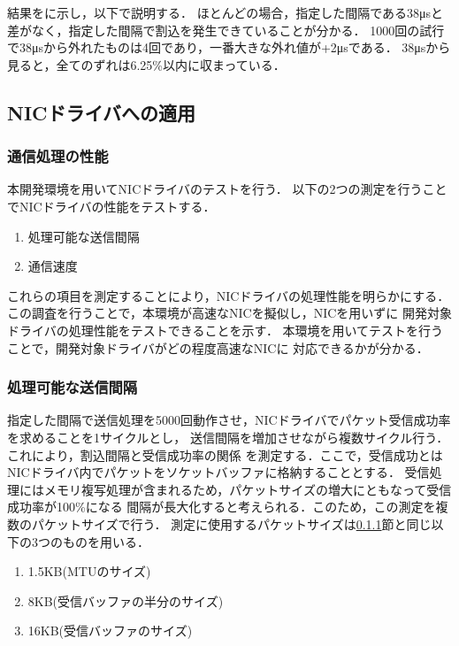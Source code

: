 \documentclass[submit,techreq,noauthor,dvipdfmx]{ipsj}
\begin{document}
結果をに示し，以下で説明する．
ほとんどの場合，指定した間隔である\mbox{38μs}と差がなく，指定した間隔で割込を発生できていることが分かる．
1000回の試行で\mbox{38μs}から外れたものは4回であり，一番大きな外れ値が\mbox{+2μs}である．
\mbox{38μs}から見ると，全てのずれは6.25\%以内に収まっている．

\subsection{NICドライバへの適用}\label{sec:interval}

\subsubsection{通信処理の性能}\label{sec:interval}

本開発環境を用いてNICドライバのテストを行う．
以下の2つの測定を行うことでNICドライバの性能をテストする．
\begin{enumerate}
    \item 処理可能な送信間隔
    \item 通信速度
\end{enumerate}
これらの項目を測定することにより，NICドライバの処理性能を明らかにする．
この調査を行うことで，本環境が高速なNICを擬似し，NICを用いずに
開発対象ドライバの処理性能をテストできることを示す．
本環境を用いてテストを行うことで，開発対象ドライバがどの程度高速なNICに
対応できるかが分かる．

\subsubsection{処理可能な送信間隔}\label{sec:mint-interval}
指定した間隔で送信処理を5000回動作させ，NICドライバでパケット受信成功率を求めることを1サイクルとし，
送信間隔を増加させながら複数サイクル行う．これにより，割込間隔と受信成功率の関係
を測定する．ここで，受信成功とはNICドライバ内でパケットをソケットバッファに格納することとする．
受信処理にはメモリ複写処理が含まれるため，パケットサイズの増大にともなって受信成功率が100\%になる
間隔が長大化すると考えられる．このため，この測定を複数のパケットサイズで行う．
測定に使用するパケットサイズは\ref{sec:interval}節と同じ以下の3つのものを用いる．
\begin{enumerate}
    \item 1.5KB(MTUのサイズ)
    \item 8KB(受信バッファの半分のサイズ)
    \item 16KB(受信バッファのサイズ)
\end{enumerate}
\end{document}
